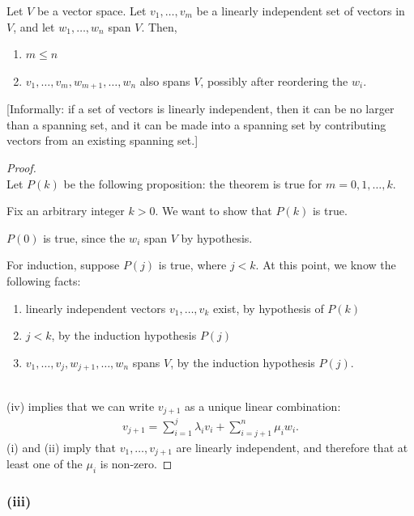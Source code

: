 \documentclass[12pt]{article}
\begin{document}
\begin{theorem*}
  Let $V$ be a vector space. Let $v_1, \ldots, v_m$ be a linearly independent
  set of vectors in $V$, and let $w_1, \ldots, w_n$ span $V$. Then,
  \begin{enumerate}[label=\roman*)]
  \item $m \leq n$
  \item $v_1, \ldots, v_m, w_{m+1}, \ldots, w_n$ also spans $V$, possibly after
    reordering the $w_i$.
  \end{enumerate}
\end{theorem*}

[Informally: if a set of vectors is linearly independent, then it can be no
larger than a spanning set, and it can be made into a spanning set by
contributing vectors from an existing spanning set.]

\begin{proof}~\\
  Let $P(k)$ be the following proposition: the theorem is true for $m = 0, 1, \ldots, k$.

  Fix an arbitrary integer $k > 0$. We want to show that $P(k)$ is true.

  $P(0)$ is true, since the $w_i$ span $V$ by hypothesis.

  For induction, suppose $P(j)$ is true, where $j < k$. At this point, we know
  the following facts:~\\

  \begin{enumerate}[label=\roman*)]
  \item linearly independent vectors $v_1, \ldots, v_k$ exist, by hypothesis of $P(k)$
  \item $j < k$, by the induction hypothesis $P(j)$
  \item $v_1, \ldots, v_j, w_{j+1}, \ldots, w_n$ spans $V$, by the induction hypothesis $P(j)$.
  \end{enumerate}
  ~\\
  (iv) implies that we can write $v_{j+1}$ as a unique linear combination:
  \begin{align*}
    v_{j+1} = \sum_{i=1}^j \lambda_iv_i + \sum_{i=j+1}^n\mu_iw_i.
  \end{align*}
  (i) and (ii) imply that $v_1, \ldots, v_{j+1}$ are linearly independent, and
  therefore that at least one of the $\mu_i$ is non-zero.

\end{proof}

\newpage
\subsubsection*{(iii)}
\end{document}

